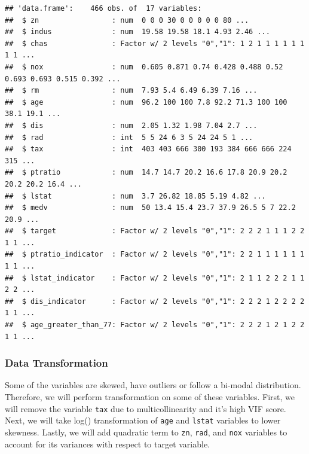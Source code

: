 \documentclass[3p]{elsarticle} %
\begin{document}
\begin{verbatim}
## 'data.frame':    466 obs. of  17 variables:
##  $ zn                 : num  0 0 0 30 0 0 0 0 0 80 ...
##  $ indus              : num  19.58 19.58 18.1 4.93 2.46 ...
##  $ chas               : Factor w/ 2 levels "0","1": 1 2 1 1 1 1 1 1 1 1 ...
##  $ nox                : num  0.605 0.871 0.74 0.428 0.488 0.52 0.693 0.693 0.515 0.392 ...
##  $ rm                 : num  7.93 5.4 6.49 6.39 7.16 ...
##  $ age                : num  96.2 100 100 7.8 92.2 71.3 100 100 38.1 19.1 ...
##  $ dis                : num  2.05 1.32 1.98 7.04 2.7 ...
##  $ rad                : int  5 5 24 6 3 5 24 24 5 1 ...
##  $ tax                : int  403 403 666 300 193 384 666 666 224 315 ...
##  $ ptratio            : num  14.7 14.7 20.2 16.6 17.8 20.9 20.2 20.2 20.2 16.4 ...
##  $ lstat              : num  3.7 26.82 18.85 5.19 4.82 ...
##  $ medv               : num  50 13.4 15.4 23.7 37.9 26.5 5 7 22.2 20.9 ...
##  $ target             : Factor w/ 2 levels "0","1": 2 2 2 1 1 1 2 2 1 1 ...
##  $ ptratio_indicator  : Factor w/ 2 levels "0","1": 2 2 1 1 1 1 1 1 1 1 ...
##  $ lstat_indicator    : Factor w/ 2 levels "0","1": 2 1 1 2 2 2 1 1 2 2 ...
##  $ dis_indicator      : Factor w/ 2 levels "0","1": 2 2 2 1 2 2 2 2 1 1 ...
##  $ age_greater_than_77: Factor w/ 2 levels "0","1": 2 2 2 1 2 1 2 2 1 1 ...
\end{verbatim}

\newpage

\hypertarget{data-transformation}{%
\subsubsection{Data Transformation}\label{data-transformation}}

Some of the variables are skewed, have outliers or follow a bi-modal
distribution. Therefore, we will perform transformation on some of these
variables. First, we will remove the variable \texttt{tax} due to
multicollinearity and it's high VIF score. Next, we will take log()
transformation of \texttt{age} and \texttt{lstat} variables to lower
skewness. Lastly, we will add quadratic term to \texttt{zn},
\texttt{rad}, and \texttt{nox} variables to account for its variances
with respect to target variable.
\end{document}
